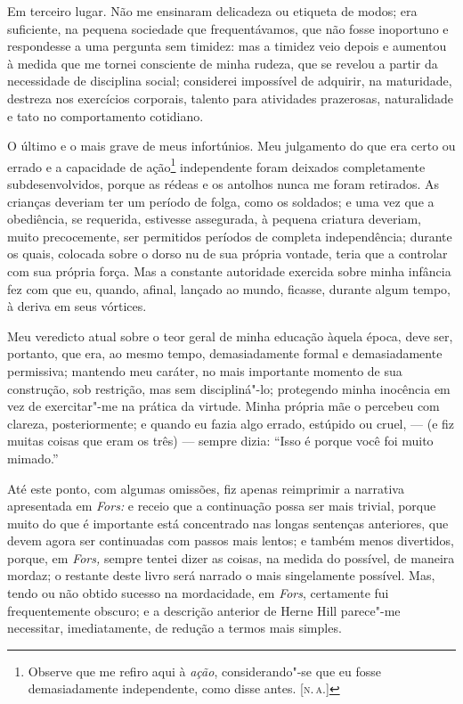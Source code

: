 Em terceiro lugar. Não me ensinaram delicadeza ou etiqueta de modos;
era suficiente, na pequena sociedade que frequentávamos, que não fosse
inoportuno e respondesse a uma pergunta sem timidez: mas a timidez veio
depois e aumentou à medida que me tornei consciente de minha rudeza, que
se revelou a partir da necessidade de disciplina social; considerei
impossível de adquirir, na maturidade, destreza nos exercícios
corporais, talento para atividades prazerosas, naturalidade e tato no
comportamento cotidiano.

O último e o mais grave de meus infortúnios. Meu julgamento do que
era certo ou errado e a capacidade de ação\footnote{Observe que me
  refiro aqui à \textit{ação}, considerando"-se que eu fosse demasiadamente
  independente, como disse antes. {[}\textsc{n.\,a.}{]}} independente foram
deixados completamente subdesenvolvidos, porque as rédeas e os antolhos
nunca me foram retirados. As crianças deveriam ter um período de folga,
como os soldados; e uma vez que a obediência, se requerida, estivesse
assegurada, à pequena criatura deveriam, muito precocemente, ser
permitidos períodos de completa independência; durante os quais,
colocada sobre o dorso nu de sua própria vontade, teria que a controlar
com sua própria força. Mas a constante autoridade exercida sobre minha
infância fez com que eu, quando, afinal, lançado ao mundo, ficasse,
durante algum tempo, à deriva em seus vórtices.

Meu veredicto atual sobre o teor geral de minha educação àquela
época, deve ser, portanto, que era, ao mesmo tempo, demasiadamente
formal e demasiadamente permissiva; mantendo meu caráter, no mais
importante momento de sua construção, sob restrição, mas sem
discipliná"-lo; protegendo minha inocência em vez de exercitar"-me na
prática da virtude. Minha própria mãe o percebeu com clareza,
posteriormente; e quando eu fazia algo errado, estúpido ou cruel, --- (e
fiz muitas coisas que eram os três) --- sempre dizia: ``Isso é porque
você foi muito mimado.''

Até este ponto, com algumas omissões, fiz apenas reimprimir a
narrativa apresentada em \textit{Fors:} e receio que a continuação possa
ser mais trivial, porque muito do que é importante está concentrado nas
longas sentenças anteriores, que devem agora ser continuadas com passos
mais lentos; e também menos divertidos, porque, em \textit{Fors,} sempre
tentei dizer as coisas, na medida do possível, de maneira mordaz; o
restante deste livro será narrado o mais singelamente possível. Mas,
tendo ou não obtido sucesso na mordacidade, em \textit{Fors}, certamente
fui frequentemente obscuro; e a descrição anterior de Herne Hill
parece"-me necessitar, imediatamente, de redução a termos mais simples.

